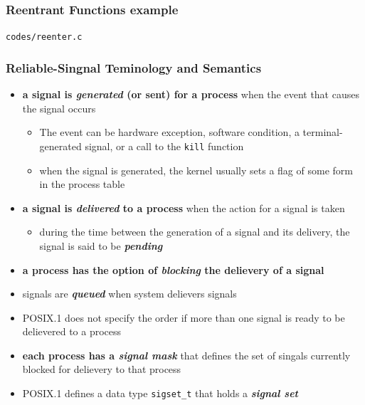 \documentclass[newPxFont,sthlmFooter,nooffset]{beamer}
\begin{document}
\begin{frame}
  \frametitle{Reentrant Functions example}
\texttt{codes/reenter.c}

\end{frame}

\begin{frame}[fragile,t]
  \frametitle{Reliable-Singnal Teminology and Semantics}

\begin{itemize}
\item  \textbf{a signal is \textit{generated} (or sent) for a process } when the event that causes the signal occurs
  \begin{itemize}
  \item  \footnotesize The event can be hardware exception, software condition, a terminal-generated signal, or a call to the \texttt{kill} function
  \item  \footnotesize when the signal is generated, the kernel usually sets a flag of some form in the process table
  \end{itemize}
\item <2-> \textbf{a signal is \textit{delivered} to a process} when the action for a signal is taken
  \begin{itemize}
  \item <2-> \footnotesize during the time between the generation of a signal and its delivery, the signal is said to be \textbf{\textit{pending}}
  \end{itemize}
\item <3-> \textbf{a process has the option of \textit{blocking} the delievery of a signal}
\item <4-> signals are \textbf{\textit{queued}} when system delievers signals
\item <5-> POSIX.1 does not specify the order if more than one signal is ready to be delievered to a process
\item <6-> \textbf{each process has a \textit{signal mask}} that defines the set of singals currently blocked for delievery to that process
\item <7-> POSIX.1 defines a data type \texttt{sigset\_t} that holds a \textbf{\textit{signal set}}

\end{itemize}

  
\end{frame}
\end{document}
